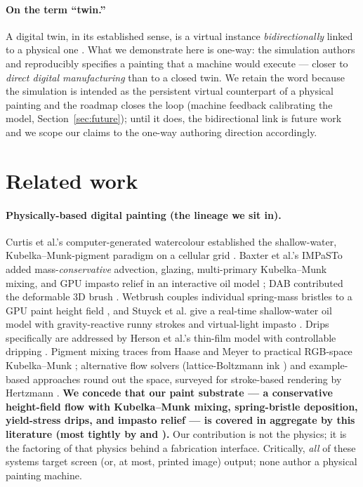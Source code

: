 \documentclass[11pt]{article}
\begin{document}
\paragraph{On the term ``twin.''} A digital twin, in its established sense, is a
virtual instance \emph{bidirectionally} linked to a physical one
\citep{grieves2017twin,glaessgen2012twin}. What we demonstrate here is one-way:
the simulation authors and reproducibly specifies a painting that a machine would
execute --- closer to \emph{direct digital manufacturing} than to a closed twin.
We retain the word because the simulation is intended as the persistent virtual
counterpart of a physical painting and the roadmap closes the loop (machine
feedback calibrating the model, Section~\ref{sec:future}); until it does, the
bidirectional link is future work and we scope our claims to the one-way authoring
direction accordingly.

\section{Related work}
\label{sec:related}

\paragraph{Physically-based digital painting (the lineage we sit in).}
Curtis et al.'s computer-generated watercolour established the shallow-water,
Kubelka--Munk-pigment paradigm on a cellular grid \citep{curtis1997watercolor}.
Baxter et al.'s IMPaSTo added mass-\emph{conservative} advection, glazing,
multi-primary Kubelka--Munk mixing, and GPU impasto relief in an interactive oil
model \citep{baxter2004impasto,baxter2004thesis}; DAB contributed the deformable
3D brush \citep{baxter2001dab}. Wetbrush couples individual spring-mass bristles
to a GPU paint height field \citep{chen2015wetbrush}, and Stuyck et al. give a
real-time shallow-water oil model with gravity-reactive runny strokes and
virtual-light impasto \citep{stuyck2016oilmobile}. Drips specifically are
addressed by Herson et al.'s thin-film model with controllable dripping
\citep{herson2026dripping}. Pigment mixing traces from Haase and Meyer
\citep{haase1992pigment} to practical RGB-space Kubelka--Munk
\citep{sochorova2021pigment}; alternative flow solvers (lattice-Boltzmann ink
\citep{chu2005moxi}) and example-based approaches
\citep{lu2013realbrush,lu2014realpigment} round out the space, surveyed for
stroke-based rendering by Hertzmann \citep{hertzmann2003sbr}. \textbf{We concede
that our paint substrate --- a conservative height-field flow with Kubelka--Munk
mixing, spring-bristle deposition, yield-stress drips, and impasto relief ---
is covered in aggregate by this literature (most tightly by
\citealp{baxter2004impasto} and \citealp{chen2015wetbrush}).} Our contribution is
not the physics; it is the factoring of that physics behind a fabrication
interface. Critically, \emph{all} of these systems target screen (or, at most,
printed image) output; none author a physical painting machine.
\end{document}
